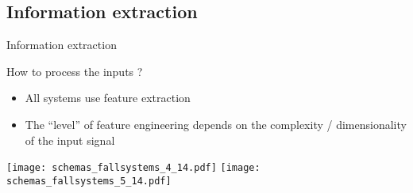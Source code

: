 \subsection{Information extraction}
\begin{frame}{Information extraction}

    \begin{minipage}[t]{0.49\linewidth}
    \vspace{0pt}
    How to process the inputs ?
    \begin{itemize}
        \item All systems use feature extraction
        \item The ``level'' of feature engineering depends on the complexity / dimensionality of the input signal
    \end{itemize}
    \end{minipage}
    \hfill
    \begin{minipage}[t]{0.49\linewidth}
    \vspace{0pt}
        \begin{overprint}
            \texttt{[image: schemas\_fallsystems\_4\_14.pdf]}
            \texttt{[image: schemas\_fallsystems\_5\_14.pdf]}
        \end{overprint}
    \end{minipage}
\end{frame}




